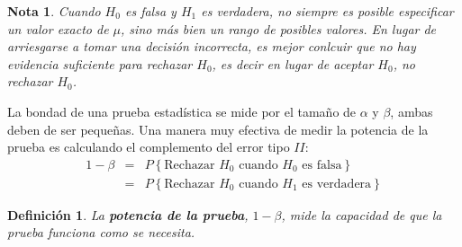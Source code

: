 \documentclass[a4paper]{report} %
\newtheorem{Def}{Definición}[chapter]
\newtheorem{Note}{Nota}[chapter]
\begin{document}
\begin{Note}
Cuando $H_{0}$ es falsa y $H_{1}$ es verdadera, no siempre es posible especificar un valor exacto de $\mu$, sino m\'as bien un rango de posibles valores.\medskip
En lugar de arriesgarse a tomar una decisi\'on incorrecta, es mejor conlcuir que \textit{no hay evidencia suficiente para rechazar $H_{0}$}, es decir en lugar de aceptar $H_{0}$, \textit{no rechazar $H_{0}$}.

\end{Note}
La bondad de una prueba estad\'istica se mide por el tama\~ no de $\alpha$ y $\beta$, ambas deben de ser peque\~ nas. Una manera muy efectiva de medir la potencia de la prueba es calculando el complemento del error tipo $II$:
\begin{eqnarray*}
1-\beta&= &P\left\{\textrm{Rechazar }H_{0}\textrm{ cuando }H_{0}\textrm{ es falsa}\right\}\\
&=&P\left\{\textrm{Rechazar }H_{0}\textrm{ cuando }H_{1}\textrm{ es verdadera}\right\}
\end{eqnarray*}
\begin{Def}
La \textbf{potencia de la prueba}, $1-\beta$, mide la capacidad de que la prueba funciona como se necesita.
\end{Def}
\end{document}
